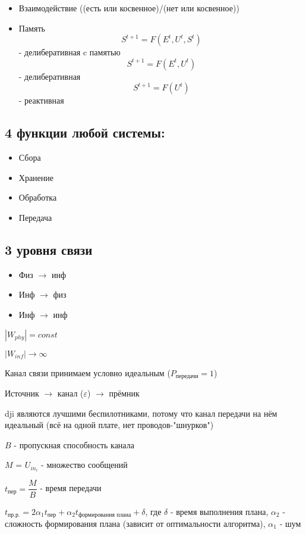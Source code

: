\documentclass{article}
\begin{document}
\begin{sloppypar}
\begin{itemize}
        \item Взаимодействие ((есть или косвенное)/(нет или косвенное))
        \item Память
              \[
                  S^{t + 1} = F(E^t, U^t, {S^{t}})
              \] - делиберативная c памятью
              \[
                  S^{t + 1} = F(E^t, U^t)
              \] - делиберативная
              \[
                  S^{t + 1} = F(U^t)
              \] - реактивная
    \end{itemize}

    \subsection{4 функции любой системы:}
    \begin{itemize}
        \item Сбора
        \item Хранение
        \item Обработка
        \item Передача
    \end{itemize}

    \subsection{3 уровня связи}
    \begin{itemize}
        \item Физ $\rightarrow$ инф
        \item Инф $\rightarrow$ физ
        \item Инф $\rightarrow$ инф
    \end{itemize}

    $|W_{phy}| = const$

    $|W_{inf}| \rightarrow \infty$

    Канал связи принимаем условно идеальным ($P_{\text{передачи}} = 1$)

    Источник $\rightarrow$ канал ($\varepsilon$) $\rightarrow$ прёмник

    dji являются лучшими беспилотниками, потому что канал передачи на нём идеальный (всё на одной плате, нет проводов-"шнурков")

    $B$ - пропускная способность канала

    $M$ = $U_{in_i}$ - множество сообщений

    $t_{\text{пер}} = \dfrac{M}{B}$ - время передачи

    $t_{пр. р.} = 2\alpha_1t_{\text{пер}} + \alpha_2t_{\text{формирования плана}} + \delta$, где $\delta$ - время выполнения плана, $\alpha_2$ - сложность формирования плана (зависит от оптимальности алгоритма), $\alpha_1$ - шум


\end{sloppypar}
\end{document}
